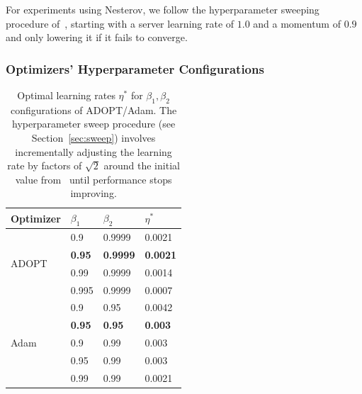 \documentclass{article}
\begin{document}
For experiments using Nesterov, we follow the hyperparameter sweeping procedure of~\citet{zhuansun2024communicationefficientfederatedlearningadaptive}, starting with a server learning rate of $1.0$ and a momentum of $0.9$ and only lowering it if it fails to converge.

\subsubsection{Optimizers' Hyperparameter Configurations}
\label{sec:hp_configs}

\begin{table}[ht]
\centering
\caption{Optimal learning rates $\eta^*$ for $\beta_1, \beta_2$ configurations of ADOPT/Adam. The hyperparameter sweep procedure (see Section~\ref{sec:sweep}) involves incrementally adjusting the learning rate by factors of $\sqrt{2}$ around the initial value from~\citet{allal2025smollm2} until performance stops improving.}
\label{tab:lr_sweep}
\begin{tabular}{llll}
\toprule
Optimizer & $\beta_1$ & $\beta_2$ & $\eta^*$ \\
\midrule
\multirow{4}{*}{ADOPT} & 0.9   & 0.9999 & 0.0021 \\
                        & \textbf{0.95}  & \textbf{0.9999} & \textbf{0.0021} \\
                        & 0.99  & 0.9999 & 0.0014 \\
                        & 0.995 & 0.9999 & 0.0007 \\
\midrule
\multirow{5}{*}{Adam}  & 0.9   & 0.95   & 0.0042 \\
                        & \textbf{0.95}  & \textbf{0.95}   & \textbf{0.003}  \\
                        & 0.9   & 0.99   & 0.003  \\
                        & 0.95  & 0.99   & 0.003  \\
                        & 0.99  & 0.99   & 0.0021 \\
\bottomrule
\end{tabular}
\end{table}
\end{document}
